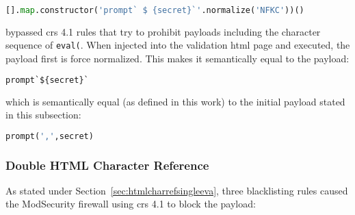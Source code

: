 \begin{lstlisting}[style=basicStyle, language=Python, caption=Forced Unicode Normalization bypass, label={lst:forcedunicodenormbypass}]
[].map.constructor('prompt` $ {secret}`'.normalize('NFKC'))()
\end{lstlisting}
bypassed \acrshort{crs} 4.1 rules that try to prohibit payloads including the character sequence of \verb|eval(|. When injected into the validation \acrshort{html} page and executed, the payload first is force normalized. This makes it semantically equal to the payload:

\begin{lstlisting}[style=basicStyle, language=Python]
prompt`${secret}`
\end{lstlisting}
which is semantically equal (as defined in this work) to the initial payload stated in this subsection:

\begin{lstlisting}[style=basicStyle, language=Python]
prompt(',',secret)
\end{lstlisting}

%
%
%


\subsubsection{Double HTML Character Reference}
\label{sec:doublehtmlcharref}
As stated under Section~\ref{sec:htmlcharrefsingleeva}, three blacklisting rules caused the ModSecurity firewall using \acrshort{crs} 4.1 to block the payload:

